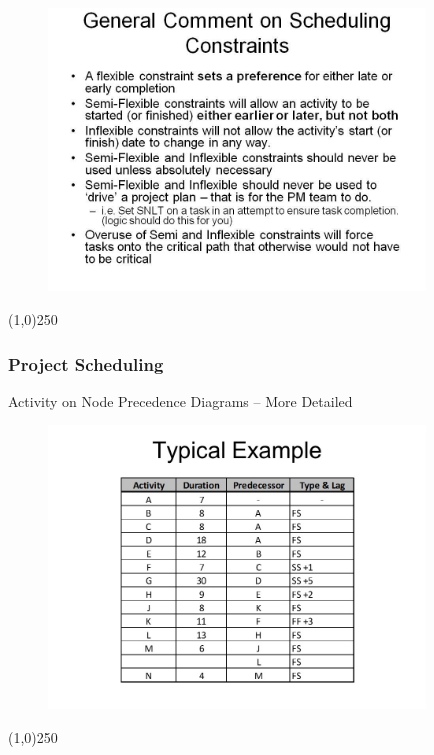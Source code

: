 \begin{frame}
\begin{figure}
	\centering
		\includegraphics[width = 10.0cm]{oldnotes/Slide188.jpg}
\end{figure}
\end{frame}
\begin{center}\line(1,0){250}\end{center}

\begin{frame}
	\frametitle{Project Scheduling}
	\begin{block}{Activity on Node}
		Precedence Diagrams -- More Detailed		
	\end{block}
\end{frame}


\begin{frame}
\begin{figure}
	\centering
		\includegraphics[width = 10.0cm]{oldnotes/Slide189.jpg}
\end{figure}
\end{frame}
\begin{center}\line(1,0){250}\end{center}




